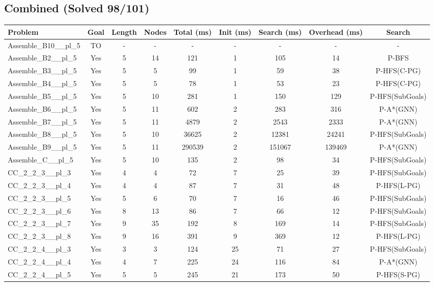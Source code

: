\documentclass{article}
\begin{document}
\subsection*{Combined (Solved 98/101)}
\begin{tabular}{lcccccccc}
\toprule
Problem & Goal & Length & Nodes & Total (ms) & Init (ms) & Search (ms) & Overhead (ms) & Search \\
\midrule
Assemble\_B10\_\_pl\_5 & TO & - & - & - & - & - & - & - \\
Assemble\_B2\_\_pl\_5 & Yes & 5 & 14 & 121 & 1 & 105 & 14 & P-BFS \\
Assemble\_B3\_\_pl\_5 & Yes & 5 & 5 & 99 & 1 & 59 & 38 & P-HFS(C-PG) \\
Assemble\_B4\_\_pl\_5 & Yes & 5 & 5 & 78 & 1 & 53 & 23 & P-HFS(C-PG) \\
Assemble\_B5\_\_pl\_5 & Yes & 5 & 10 & 281 & 1 & 150 & 129 & P-HFS(SubGoals) \\
Assemble\_B6\_\_pl\_5 & Yes & 5 & 11 & 602 & 2 & 283 & 316 & P-A*(GNN) \\
Assemble\_B7\_\_pl\_5 & Yes & 5 & 11 & 4879 & 2 & 2543 & 2333 & P-A*(GNN) \\
Assemble\_B8\_\_pl\_5 & Yes & 5 & 10 & 36625 & 2 & 12381 & 24241 & P-HFS(SubGoals) \\
Assemble\_B9\_\_pl\_5 & Yes & 5 & 11 & 290539 & 2 & 151067 & 139469 & P-A*(GNN) \\
Assemble\_C\_\_pl\_5 & Yes & 5 & 10 & 135 & 2 & 98 & 34 & P-HFS(SubGoals) \\
CC\_2\_2\_3\_\_pl\_3 & Yes & 4 & 4 & 72 & 7 & 25 & 39 & P-HFS(SubGoals) \\
CC\_2\_2\_3\_\_pl\_4 & Yes & 4 & 4 & 87 & 7 & 31 & 48 & P-HFS(L-PG) \\
CC\_2\_2\_3\_\_pl\_5 & Yes & 5 & 6 & 70 & 7 & 16 & 46 & P-HFS(SubGoals) \\
CC\_2\_2\_3\_\_pl\_6 & Yes & 8 & 13 & 86 & 7 & 66 & 12 & P-HFS(SubGoals) \\
CC\_2\_2\_3\_\_pl\_7 & Yes & 9 & 35 & 192 & 8 & 169 & 14 & P-HFS(SubGoals) \\
CC\_2\_2\_3\_\_pl\_8 & Yes & 9 & 16 & 391 & 9 & 369 & 12 & P-HFS(L-PG) \\
CC\_2\_2\_4\_\_pl\_3 & Yes & 3 & 3 & 124 & 25 & 71 & 27 & P-HFS(SubGoals) \\
CC\_2\_2\_4\_\_pl\_4 & Yes & 4 & 7 & 225 & 24 & 116 & 84 & P-A*(GNN) \\
CC\_2\_2\_4\_\_pl\_5 & Yes & 5 & 5 & 245 & 21 & 173 & 50 & P-HFS(S-PG) \\

\end{tabular}
\end{document}
